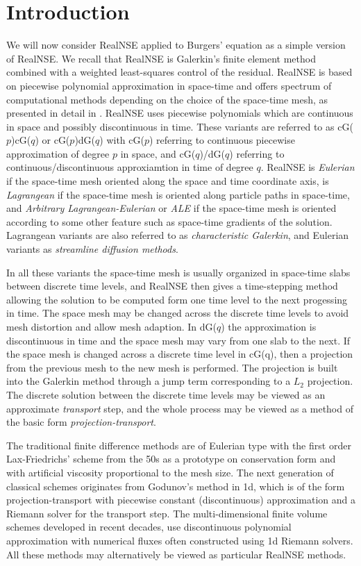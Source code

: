 \section{Introduction}
We will now consider RealNSE applied to Burgers' equation as a simple
version of RealNSE. We recall that RealNSE is Galerkin's 
finite element method
combined with a weighted least-squares control of the
residual. RealNSE is based on  piecewise polynomial approximation
in space-time and offers spectrum of computational methods 
depending on the choice of the space-time
mesh, as presented in detail in \cite{cde,ambsflow}.
RealNSE uses piecewise polynomials which are
continuous in space and possibly discontinuous in time.
These variants are referred to as cG($p$)cG($q$) or cG($p$)dG($q$) with
cG($p$) referring to continuous piecewise approximation of degree $p$
in space, and cG($q$)/dG($q$) referring to  continuous/discontinuous
approxiamtion in time of degree $q$. RealNSE is \emph{Eulerian} if
the space-time mesh oriented along the space and time coordinate axis, 
is \emph{Lagrangean} if the space-time mesh is oriented along particle
paths in space-time, and \emph{Arbitrary Lagrangean-Eulerian} or \emph{ALE} 
if the space-time mesh is oriented according to some other feature such as
space-time gradients of the solution. 
Lagrangean variants are also referred to as \emph{characteristic Galerkin}, 
and Eulerian variants as \emph{streamline diffusion methods}.

In all these variants the space-time mesh is usually organized in
space-time slabs between discrete time levels, and RealNSE then
gives a time-stepping method allowing the solution to be
computed form one time level to the next progessing in time. The
space mesh may be changed across the discrete time levels to avoid 
mesh distortion and allow mesh adaption. In dG($q$) the
approximation is discontinuous in time and the space
mesh may vary from one slab to the next. If the space mesh is changed 
across a discrete time level in cG(q), then
a projection from the previous mesh 
to the new mesh is performed. The projection is built 
into the Galerkin method  through a jump term corresponding to a 
$L_2$ projection. The discrete solution between the
discrete time levels may be viewed as an approximate {\em transport} step,
and the whole process may be viewed as a method of the basic form
\emph{projection-transport}. 

The traditional finite difference methods are of Eulerian type with the 
first order Lax-Friedrichs' scheme from the 50s as a prototype on 
conservation form  
and with artificial viscosity proportional to the mesh size. The next 
generation
of classical schemes originates from Godunov's method in 1d, 
which is of the form projection-transport with piecewise constant 
(discontinuous) approximation  and a Riemann solver for the transport step. 
The multi-dimensional finite volume schemes 
developed in recent decades, use discontinuous polynomial
approximation with numerical fluxes often constructed using
1d Riemann solvers. 
All these methods may alternatively be viewed as particular 
RealNSE methods. 


